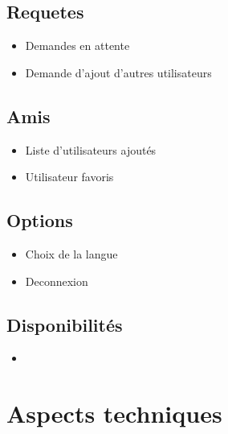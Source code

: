 \documentclass{beamer}
\begin{document}
\subsection{Requetes}
\begin{frame}
	\begin{itemize}
	\item{Demandes en attente}
	\item{
	Demande d'ajout d'autres utilisateurs
	}
	
	\end{itemize}
\end{frame}



\subsection{Amis}
\begin{frame}
	\begin{itemize}
	\item{
	Liste d'utilisateurs ajoutés
    
	}
	\item{Utilisateur favoris}
	
	\end{itemize}
\end{frame}

\subsection{Options}
\begin{frame}
\begin{itemize}
    \item{Choix de la langue}
    \item{Deconnexion}
    
\end{itemize}
\end{frame}

\subsection{Disponibilités}
\begin{frame}
  \begin{itemize}
      \item{}
  \end{itemize}
\end{frame}


\section{Aspects techniques}
\end{document}
